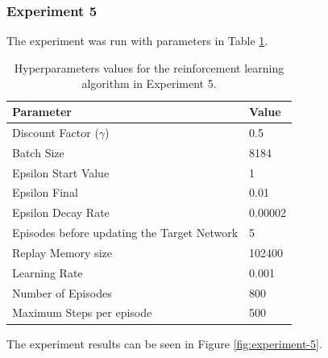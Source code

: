 \documentclass[12pt,oneside]{article}
\begin{document}
\subsubsection{Experiment 5}\label{experiment:experiment-5}
The experiment was run with parameters in Table \ref{tab:hyperparams-exp-5}.
\begin{table}[H]
\centering
\begin{tabular}{l l}
\hline
Parameter & Value \\
\hline
Discount Factor ($\gamma$) & 0.5 \\
Batch Size & 8184 \\
Epsilon Start Value & 1 \\
Epsilon Final & 0.01 \\
Epsilon Decay Rate & 0.00002 \\
Episodes before updating the Target Network & 5 \\
Replay Memory size & 102400 \\
Learning Rate & 0.001 \\
Number of Episodes & 800 \\
Maximum Steps per episode & 500 \\
\hline
\end{tabular}
\caption{Hyperparameters values for the reinforcement learning algorithm in Experiment 5.}
\label{tab:hyperparams-exp-5}
\end{table}
The experiment results can be seen in Figure \ref{fig:experiment-5}.
\end{document}
